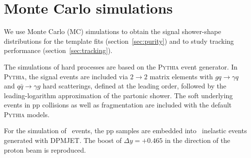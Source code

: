 










\section{Monte Carlo simulations}
\label{sec:mcsimulations}
We use Monte Carlo (MC) simulations to obtain the signal shower-shape distributions for the template fits (section~\ref{sec:purity}) and to study tracking performance (section~\ref{sec:tracking}).

The simulations of hard processes are based on the \textsc{Pythia} event generator. In \textsc{Pythia}, the signal events are included via $2\to2$ matrix elements with $gq\to\gamma q$ and $q\bar{q}\to\gamma g$ hard scatterings, defined at the leading order, followed by the leading-logarithm approximation of the partonic shower. The soft underlying events in pp collisions as well as fragmentation are included with the default \textsc{Pythia} models. 

For the simulation of \pPb~events, the pp samples are embedded into \pPb~inelastic events generated with \textsc{DPMJET}. The boost of $\Delta y=+0.465$ in the direction of the proton beam is reproduced. %

